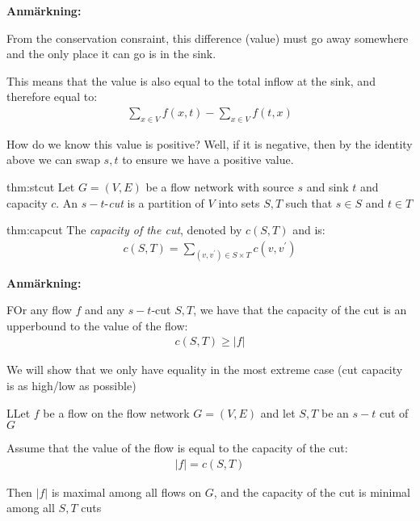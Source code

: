 \par\bigskip
\noindent\textbf{Anmärkning:}\par
\noindent From the conservation consraint, this difference (value) must go away somewhere and the only place it can go is in the sink.
\par\bigskip
\noindent This means that the value is also equal to the total inflow at the sink, and therefore equal to:
\begin{equation*}
  \begin{gathered}
    \sum_{x\in V}f(x,t)-\sum_{x\in V}f(t,x)
  \end{gathered}
\end{equation*}
\par\bigskip
\noindent How do we know this value is positive? Well, if it is negative, then by the identity above we can swap $s,t$ to ensure we have a positive value.
\par\bigskip
\begin{theo}[$s-t$-cut]{thm:stcut}
  Let $G = (V,E)$ be a flow network with source $s$ and sink $t$ and capacity $c$.
  \noindent An $s-t$-\textit{cut} is a partition of $V$ into sets $S,T$ such that $s\in S$ and $t\in T$ 
\end{theo}
\par\bigskip
\begin{theo}{thm:capcut}
  The \textit{capacity of the cut}, denoted by $c(S,T)$ and is:
  \begin{equation*}
    \begin{gathered}
      c(S,T) = \sum_{(v,v^{\prime})\in S\times T}c(v,v^{\prime})
    \end{gathered}
  \end{equation*}
\end{theo}
\par\bigskip
\noindent\textbf{Anmärkning:}\par
\noindent FOr any flow $f$ and any $s-t$-cut $S,T$, we have that the capacity of the cut is an upperbound to the value of the flow:
\begin{equation*}
  \begin{gathered}
    c(S,T)\geq \left|f\right|
  \end{gathered}
\end{equation*}
\par\bigskip
\noindent We will show that we only have equality in the most extreme case (cut capacity is as high/low as possible)
\newpage
\begin{lem}
  LLet $f$ be a flow on the flow network $G = (V,E)$ and let $S,T$ be an $s-t$ cut of $G$
  \par\bigskip
  \noindent Assume that the value of the flow is equal to the capacity of the cut:
  \begin{equation*}
    \begin{gathered}
      \left|f\right| = c(S,T)
    \end{gathered}
  \end{equation*}
  \par\bigskip
  \noindent Then $\left|f\right|$ is maximal among all flows on $G$, and the capacity of the cut is minimal among all $S,T$ cuts 
\end{lem}
